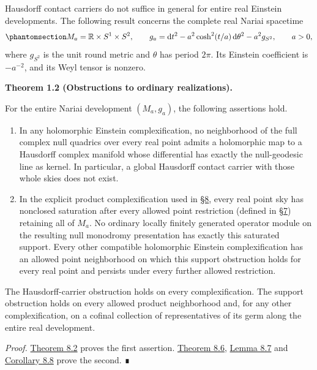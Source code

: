 \documentclass[
  english,
  11pt,
  reqno]{amsart}
\makeatletter
\providecommand{\tightlist}{%
  \setlength{\itemsep}{0pt}\setlength{\parskip}{0pt}}
\newcommand{\pandocstatementheading}[1]{%
  \par\addpenalty{\@beginparpenalty}%
  \addvspace{.5\baselineskip plus .2\baselineskip minus .2\baselineskip}%
  {\normalfont\bfseries #1\par}%
  \nobreak\@afterindenttrue\@afterheading
}
\makeatother
\begin{document}
Hausdorff contact carriers do not suffice in general for entire real
Einstein developments. The following result concerns the complete real
Nariai spacetime
\begin{equation}\protect\phantomsection\label{eq:focused-nariai-metric-v08}{
M_a=\mathbb R\times S^1\times S^2,
\qquad
g_a=\mathrm dt^2-a^2\cosh^2(t/a)\,\mathrm d\theta^2-a^2g_{S^2},
\qquad a>0,
}\end{equation} where \(g_{S^2}\) is the unit round metric and
\(\theta\) has period \(2\pi\). Its Einstein coefficient is \(-a^{-2}\),
and its Weyl tensor is nonzero.

\pandocstatementheading{\protect{}\label{thm:global-realization-obstructions-v09}Theorem 1.2 (Obstructions to ordinary realizations).}

For the entire Nariai development \((M_a,g_a)\), the following
assertions hold.

\begin{enumerate}
\tightlist
\item
  In any holomorphic Einstein complexification, no neighborhood of the
  full complex null quadrics over every real point admits a holomorphic
  map to a Hausdorff complex manifold whose differential has exactly the
  null-geodesic line as kernel. In particular, a global Hausdorff
  contact carrier with those whole skies does not exist.
\item
  In the explicit product complexification used in
  \hyperref[sec:nariai-obstructions-v08]{§8}, every real point sky has
  nonclosed saturation after every allowed point restriction (defined in
  \hyperref[sec:germ-correspondence-v08]{§7}) retaining all of \(M_a\).
  No ordinary locally finitely generated operator module on the
  resulting null monodromy presentation has exactly this saturated
  support. Every other compatible holomorphic Einstein complexification
  has an allowed point neighborhood on which this support obstruction
  holds for every real point and persists under every further allowed
  restriction.
\end{enumerate}

The Hausdorff-carrier obstruction holds on every complexification. The
support obstruction holds on every allowed product neighborhood and, for
any other complexification, on a cofinal collection of representatives
of its germ along the entire real development.

\emph{Proof.}
\hyperref[thm:nariai-no-hausdorff-whole-sky-carrier]{Theorem 8.2} proves
the first assertion.
\hyperref[thm:nariai-all-real-nonclosed-point-skies-v09]{Theorem 8.6},
\hyperref[lem:finite-module-closed-support]{Lemma 8.7} and
\hyperref[cor:nariai-cofinal-point-module-obstruction-v09]{Corollary
8.8} prove the second. ∎
\end{document}
